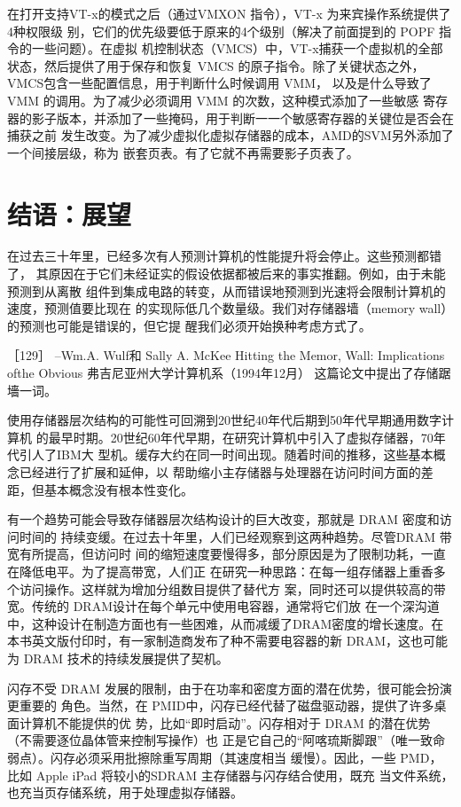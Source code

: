 在打开支持VT-x的模式之后（通过VMXON 指令），VT-x 为来宾操作系统提供了4种权限级
别，它们的优先级要低于原来的4个级别（解决了前面提到的 POPF 指令的一些问题）。在虚拟
机控制状态（VMCS）中，VT-x捕获一个虚拟机的全部状态，然后提供了用于保存和恢复 VMCS
的原子指令。除了关键状态之外，VMCS包含一些配置信息，用于判断什么时候调用 VMM，
以及是什么导致了 VMM 的调用。为了减少必须调用 VMM 的次数，这种模式添加了一些敏感
寄存器的影子版本，并添加了一些掩码，用于判断一一个敏感寄存器的关键位是否会在捕获之前
发生改变。为了减少虚拟化虚拟存储器的成本，AMD的SVM另外添加了一个间接层级，称为
嵌套页表。有了它就不再需要影子页表了。

\section{结语：展望}
在过去三十年里，已经多次有人预测计算机的性能提升将会停止。这些预测都错了，
其原因在于它们未经证实的假设依据都被后来的事实推翻。例如，由于未能预测到从离散
组件到集成电路的转变，从而错误地预测到光速将会限制计算机的速度，预测值要比现在
的实现际低几个数量级。我们对存储器墙（memory wall）的预测也可能是错误的，但它提
醒我们必须开始换种考虑方式了。

［129］
--Wm.A. Wulf和 Sally A. McKee
Hitting the Memor, Wall: Implications ofthe Obvious
弗吉尼亚州大学计算机系（1994年12月）
这篇论文中提出了存储踞墻一词。

使用存储器层次结构的可能性可回溯到20世纪40年代后期到50年代早期通用数字计算机
的最早时期。20世纪60年代早期，在研究计算机中引入了虚拟存储器，70年代引人了IBM大
型机。缓存大约在同一时间出现。随着时间的推移，这些基本概念已经进行了扩展和延伸，以
帮助缩小主存储器与处理器在访问时间方面的差距，但基本概念没有根本性变化。

有一个趋势可能会导致存储器层次结构设计的巨大改变，那就是 DRAM 密度和访问时间的
持续变缓。在过去十年里，人们已经观察到这两种趋势。尽管DRAM 带宽有所提高，但访问时
间的缩短速度要慢得多，部分原因是为了限制功耗，一直在降低电平。为了提高带宽，人们正
在研究一种思路：在每一组存储器上重香多个访问操作。这样就为增加分组数目提供了替代方
案，同时还可以提供较高的带宽。传统的 DRAM设计在每个单元中使用电容器，通常将它们放
在一个深沟道中，这种设计在制造方面也有一些困难，从而减缓了DRAM密度的增长速度。在
本书英文版付印时，有一家制造商发布了种不需要电容器的新 DRAM，这也可能为 DRAM
技术的持续发展提供了契机。

闪存不受 DRAM 发展的限制，由于在功率和密度方面的潜在优势，很可能会扮演更重要的
角色。当然，在 PMID中，闪存已经代替了磁盘驱动器，提供了许多桌面计算机不能提供的优
势，比如“即时启动”。闪存相对于 DRAM 的潜在优势（不需要逐位晶体管来控制写操作）也
正是它自己的“阿喀琉斯脚跟”（唯一致命弱点）。闪存必须采用批擦除重写周期（其速度相当
缓慢）。因此，一些 PMD，比如 Apple iPad 将较小的SDRAM 主存储器与闪存结合使用，既充
当文件系统，也充当页存储系统，用于处理虚拟存储器。

